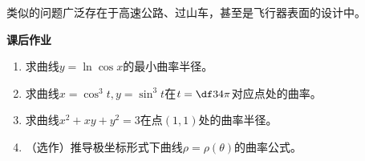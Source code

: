 \begin{center}
	\quad
\end{center}

类似的问题广泛存在于高速公路、过山车，甚至是飞行器表面的设计中。

\begin{ext}
	{\bf 课后作业}
	
	\begin{enumerate}
	  \item 求曲线$y=\ln\cos x$的最小曲率半径。
	  \item 求曲线$x=\cos^3t,y=\sin^3t$在$t=\df34\pi$对应点处的曲率。
	  \item 求曲线$x^2+xy+y^2=3$在点$(1,1)$处的曲率半径。
	  \item （选作）推导极坐标形式下曲线$\rho=\rho(\theta)$的曲率公式。
	\end{enumerate}
\end{ext}

